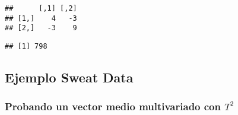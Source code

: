 \documentclass[
]{article}
\newenvironment{Shaded}{\begin{snugshade}}{\end{snugshade}}
\newcommand{\CommentTok}[1]{\textcolor[rgb]{0.56,0.35,0.01}{\textit{#1}}}
\newcommand{\DecValTok}[1]{\textcolor[rgb]{0.00,0.00,0.81}{#1}}
\newcommand{\FloatTok}[1]{\textcolor[rgb]{0.00,0.00,0.81}{#1}}
\newcommand{\KeywordTok}[1]{\textcolor[rgb]{0.13,0.29,0.53}{\textbf{#1}}}
\newcommand{\NormalTok}[1]{#1}
\newcommand{\OperatorTok}[1]{\textcolor[rgb]{0.81,0.36,0.00}{\textbf{#1}}}
\newcommand{\StringTok}[1]{\textcolor[rgb]{0.31,0.60,0.02}{#1}}
\begin{document}
\begin{Shaded}
\end{Shaded}

\begin{verbatim}
##      [,1] [,2]
## [1,]    4   -3
## [2,]   -3    9
\end{verbatim}

\begin{Shaded}
\end{Shaded}

\begin{verbatim}
## [1] 798
\end{verbatim}

\hypertarget{ejemplo-sweat-data}{%
\subsection{Ejemplo Sweat Data}\label{ejemplo-sweat-data}}

\hypertarget{probando-un-vector-medio-multivariado-con-t2}{%
\subsubsection{\texorpdfstring{Probando un vector medio multivariado con
\(T^{2}\)}{Probando un vector medio multivariado con T\^{}\{2\}}}\label{probando-un-vector-medio-multivariado-con-t2}}
\end{document}
